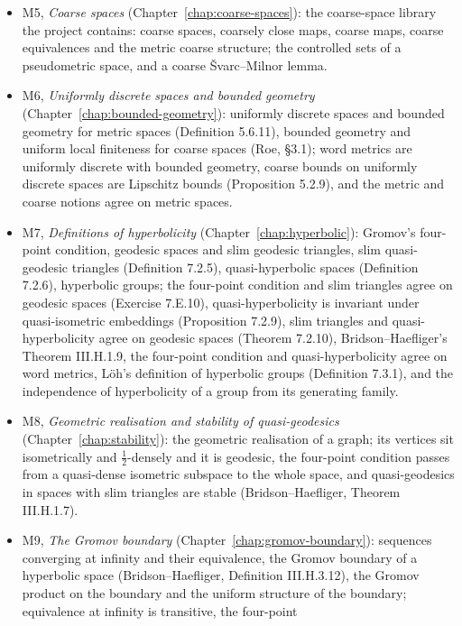 \begin{itemize}
  \item M5, \emph{Coarse spaces} (Chapter~\ref{chap:coarse-spaces}): the coarse-space library
        the project contains: coarse spaces, coarsely close maps, coarse maps, coarse
        equivalences and the metric coarse structure; the controlled sets of a pseudometric
        space, and a coarse \v{S}varc--Milnor lemma.
  \item M6, \emph{Uniformly discrete spaces and bounded geometry}
        (Chapter~\ref{chap:bounded-geometry}): uniformly discrete spaces and bounded geometry
        for metric spaces (Definition 5.6.11), bounded geometry and uniform local finiteness for
        coarse spaces (Roe, \S3.1); word metrics are uniformly discrete with bounded geometry,
        coarse bounds on uniformly discrete spaces are Lipschitz bounds (Proposition 5.2.9), and
        the metric and coarse notions agree on metric spaces.
  \item M7, \emph{Definitions of hyperbolicity} (Chapter~\ref{chap:hyperbolic}): Gromov's four-point
        condition, geodesic spaces and slim geodesic triangles, slim quasi-geodesic triangles
        (Definition 7.2.5), quasi-hyperbolic spaces (Definition 7.2.6), hyperbolic groups; the
        four-point condition and slim triangles agree on geodesic spaces (Exercise 7.E.10),
        quasi-hyperbolicity is invariant under quasi-isometric embeddings (Proposition 7.2.9), slim
        triangles and quasi-hyperbolicity agree on geodesic spaces (Theorem 7.2.10),
        Bridson--Haefliger's Theorem III.H.1.9, the four-point condition and quasi-hyperbolicity
        agree on word metrics, L\"oh's definition of hyperbolic groups (Definition 7.3.1), and the
        independence of hyperbolicity of a group from its generating family.
  \item M8, \emph{Geometric realisation and stability of quasi-geodesics}
        (Chapter~\ref{chap:stability}): the geometric realisation of a graph; its vertices sit
        isometrically and $\frac12$-densely and it is geodesic, the four-point condition passes
        from a quasi-dense isometric subspace to the whole space, and quasi-geodesics in spaces
        with slim triangles are stable (Bridson--Haefliger, Theorem III.H.1.7).
  \item M9, \emph{The Gromov boundary} (Chapter~\ref{chap:gromov-boundary}): sequences
        converging at infinity and their equivalence, the Gromov boundary of a hyperbolic space
        (Bridson--Haefliger, Definition III.H.3.12), the Gromov product on the boundary and the
        uniform structure of the boundary; equivalence at infinity is transitive, the four-point

\end{itemize}
